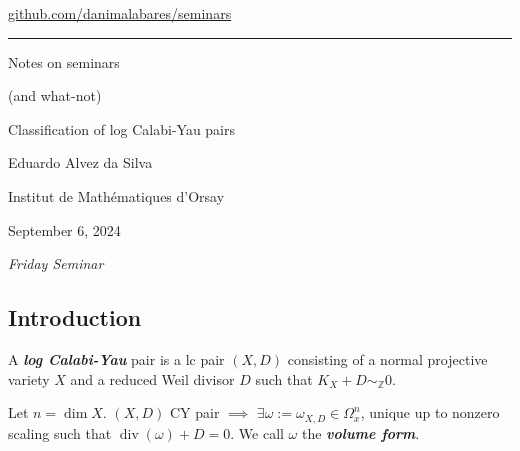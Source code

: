 


\begin{minipage}{\textwidth}
	\begin{minipage}{1\textwidth}
		 \hfill 		
		{\small\hfill\href{https://github.com/danimalabares/seminars}{github.com/danimalabares/seminars}}

		
	\end{minipage}
\end{minipage}\vspace{.2cm}\hrule
\vspace{10pt}
{\Huge Notes on seminars}

{\large (and what-not)}
\tableofcontents

\clearpage{}
{\Huge Classification of log Calabi-Yau pairs}

\hfill{\Large Eduardo Alvez da Silva}

{\Large \hfill Institut de Mathématiques d'Orsay}

\hfill{\large September 6, 2024

\hfill \textit{Friday Seminar}}

\subsection{Introduction}


\begin{defn}
	A \textit{\textbf{log Calabi-Yau}} pair is a lc pair  $(X,D)$ consisting of a normal projective variety $X$ and a reduced Weil divisor $D$ such that $K_X+D\sim_{\mathbb{Z}}0$.
\end{defn}

\begin{remark}
	Let $n=\dim X$. $(X,D)$ CY pair $\implies $ $\exists \omega:=\omega_{X,D}\in\Omega^n_x$, unique up to nonzero scaling such that $\operatorname{div}(\omega)+D=0$. We call $\omega$ the \textit{\textbf{volume form}}.
\end{remark}

